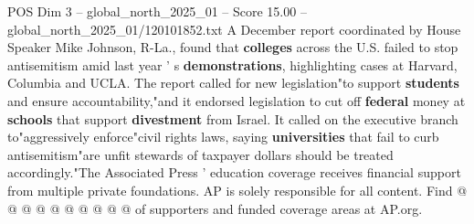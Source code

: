 \begin{textsample}{POS Dim 3 – global\_north\_2025\_01 – Score 15.00 – global\_north\_2025\_01/120101852.txt}
A December report coordinated by House Speaker Mike Johnson, R-La., found that \textbf{colleges} across the U.S. failed to stop antisemitism amid last year ' s \textbf{demonstrations}, highlighting cases at Harvard, Columbia and UCLA.
The report called for new legislation"to support \textbf{students} and ensure accountability,"and it endorsed legislation to cut off \textbf{federal} money at \textbf{schools} that support \textbf{divestment} from Israel.
It called on the executive branch to"aggressively enforce"civil rights laws, saying \textbf{universities} that fail to curb antisemitism"are unfit stewards of taxpayer dollars should be treated accordingly."The Associated Press ' education coverage receives financial support from multiple private foundations.
AP is solely responsible for all content.
Find @ @ @ @ @ @ @ @ @ @ of supporters and funded coverage areas at AP.org.

\end{textsample}
